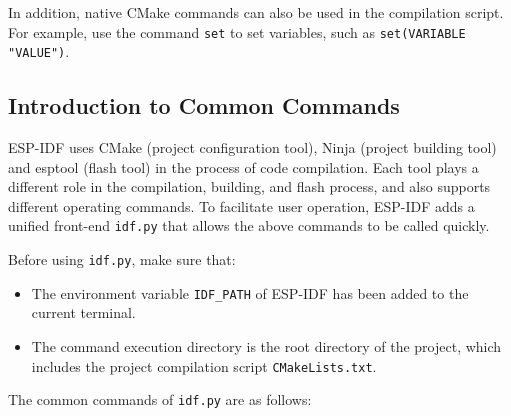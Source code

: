 \documentclass[a4paper,12pt]{book}
\begin{document}
In addition, native CMake commands can also be used in the compilation script. For example, use the command \verb|set| to set variables, such as \verb|set(VARIABLE "VALUE")|.

\subsection{Introduction to Common Commands}
ESP-IDF uses CMake (project configuration tool), Ninja (project building tool) and esptool (flash tool) in the process of code compilation. Each tool plays a different role in the compilation, building, and flash process, and also supports different operating commands. To facilitate user operation, ESP-IDF adds a unified front-end \verb|idf.py| that allows the above commands to be called quickly.

Before using \verb|idf.py|, make sure that:

\begin{itemize}[leftmargin=1.5em, noitemsep]
    \item The environment variable \verb|IDF_PATH| of ESP-IDF has been added to the current terminal.
    \item The command execution directory is the root directory of the project, which includes the project compilation script \verb|CMakeLists.txt|.
\end{itemize}

The common commands of \verb|idf.py| are as follows:
\end{document}
